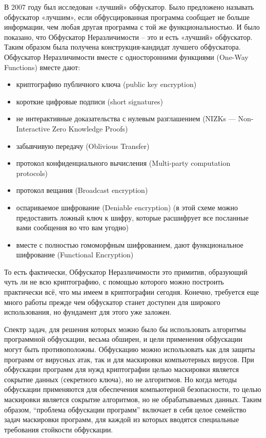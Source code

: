 В 2007\cite{Cit5} году был исследован «лучший» обфускатор. Было предложено называть обфускатор «лучшим», если обфусцированная программа сообщает не больше информации, чем любая другая программа с той же функциональностью. И было показано, что Обфускатор Неразличимости -- это и есть «лучший» обфускатор. Таким образом была получена конструкция-кандидат лучшего обфускатора. Обфускатор Неразличимости вместе с односторонними функциями (One-Way Functions) вместе дают:
\begin{itemize}
\item криптографию публичного ключа (public key encryption)
\item короткие цифровые подписи (short signatures)
\item не интерактивные доказательства с нулевым разглашением (NIZKs — Non-Interactive Zero Knowledge Proofs)
\item забывчивую передачу (Oblivious Transfer)
\item протокол конфиденциального вычисления (Multi-party computation protocols)
\item протокол вещания (Broadcast encryption)
\item оспариваемое шифрование (Deniable encryption) (в этой схеме можно предоставить ложный ключ к шифру, которые расшифрует все посланные вами сообщения во что вам угодно)
\item вместе с полностью гомоморфным шифрованием, дают функциональное шифрование (Functional Encryption)
\end{itemize}

То есть фактически, Обфускатор Неразличимости это примитив, образующий чуть ли не всю криптографию, с помощью которого можно построить практически всё, что мы имеем в криптографии сегодня. Конечно, требуется еще много работы прежде чем обфускатор станет доступен для широкого использования, но фундамент для этого уже заложен.

Спектр задач, для решения которых можно было бы использовать алгоритмы программной обфускации, весьма обширен, и цели применения обфускации могут быть противоположны. Обфускацию можно использовать как для защиты программ от вирусных атак, так и для маскировки компьютерных вирусов. При обфускации программ для нужд криптографии целью маскировки является сокрытие данных (секретного ключа), но не алгоритмов. Но когда методы обфускации применяются для обеспечения компьютерной безопасности, то целью маскировки является сокрытие алгоритмов, но не обрабатываемых данных. Таким образом, “проблема обфускации программ” включает в себя целое семейство задач маскировки программ, для каждой из которых вводятся специальные требования стойкости обфускации. 

